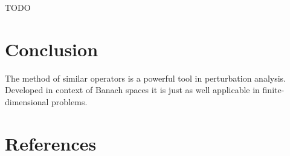 \documentclass[a4paper]{jpconf}
\begin{document}
TODO

\section*{Conclusion}
The method of similar operators
    is a powerful tool in perturbation analysis.
Developed in context of Banach spaces
    it is just as well applicable
    in finite-dimensional problems.
\section*{References}

{}
\end{document}
